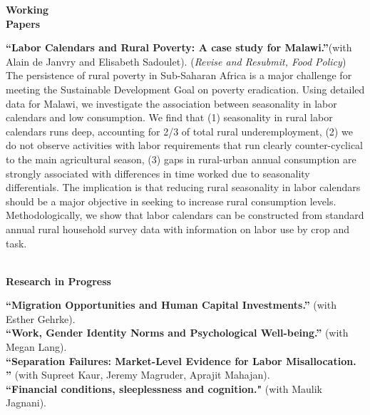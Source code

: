 \documentclass[10pt, oneside]{article}
\begin{document}
\begin{minipage}[t]{0.1\linewidth}
\textbf{Working\\Papers}
\end{minipage}\hspace{0.05\linewidth}
\begin{minipage}[t]{0.8\linewidth}
\textbf{``Labor Calendars and Rural Poverty: A case study for Malawi.''}(with Alain de Janvry and Elisabeth Sadoulet). (\emph{Revise and Resubmit, Food Policy})  \href{http://claireduq.github.io/laborcal_FP_revision_adj.pdf}{\color{blue}{Available here}}\\
The persistence of rural poverty in Sub-Saharan Africa is a major challenge for meeting the Sustainable Development Goal on poverty eradication. Using detailed data for Malawi, we investigate the association between seasonality in labor calendars and low consumption. We find that (1) seasonality in rural labor calendars runs deep, accounting for 2/3 of total rural underemployment, (2) we do not observe activities with labor requirements that run clearly counter-cyclical to the main agricultural season, (3) gaps in rural-urban annual consumption are strongly associated with differences in time worked due to seasonality differentials. The implication is that reducing rural seasonality in labor calendars should be a major objective in seeking to increase rural consumption levels. Methodologically, we show that labor calendars can be constructed from standard annual rural household survey data with information on labor use by crop and task.\\~\\
\end{minipage}\vspace{4mm}


\begin{minipage}[t]{0.1\linewidth}
\textbf{Research in Progress}
\end{minipage}\hspace{0.05\linewidth}
\begin{minipage}[t]{0.8\linewidth}
\textbf{``Migration Opportunities and Human Capital Investments.''} (with Esther Gehrke). \\ 
\textbf{``Work, Gender Identity Norms and Psychological Well-being.''} (with Megan Lang). \\
\textbf{``Separation Failures: Market-Level Evidence for Labor Misallocation. ''} (with Supreet Kaur, Jeremy Magruder, Aprajit Mahajan). \\
\textbf{``Financial conditions, sleeplessness and cognition."} (with Maulik Jagnani). 
\end{minipage}\vspace{4mm} 
\end{document}
